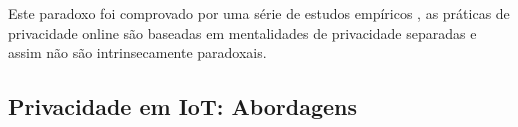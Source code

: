\documentclass[conference]{IEEEtran}
\begin{document}

Este paradoxo foi comprovado por uma série de estudos empíricos \cite{dienlin2015privacy, xie2019consumers, SCHWAIG20131, sannon2018privacy},
as práticas de privacidade online são baseadas em mentalidades de privacidade
separadas e assim não são intrinsecamente paradoxais.


\subsection{Privacidade em IoT: Abordagens}
\end{document}
